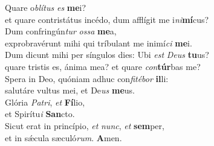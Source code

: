 \oddverse Quare o\textit{blí}\textit{tus} \textit{es} \textbf{me}i?~\*\\
\oddverse et quare contristátus incédo, dum afflígit me i\textit{ni}\textbf{mí}cus?\\
\evenverse Dum confringún\textit{tur} \textit{os}\textit{sa} \textbf{me}a,~\*\\
\evenverse exprobravérunt mihi qui tríbulant me inimí\textit{ci} \textbf{me}i.\\
\oddverse Dum dicunt mihi per síngulos dies: Ubi \textit{est} \textit{De}\textit{us} \textbf{tu}us?~\*\\
\oddverse quare tristis es, ánima mea? et quare \textit{con}\textbf{túr}bas me?\\
\evenverse Spera in Deo, quóniam adhuc con\textit{fi}\textit{té}\textit{bor} \textbf{il}li:~\*\\
\evenverse salutáre vultus mei, et De\textit{us} \textbf{me}us.\\
\oddverse Glória \textit{Pa}\textit{tri}, \textit{et} \textbf{Fí}lio,~\*\\
\oddverse et Spirítu\textit{i} \textbf{San}cto.\\
\evenverse Sicut erat in princípio, \textit{et} \textit{nunc}, \textit{et} \textbf{sem}per,~\*\\
\evenverse et in sǽcula sæculó\textit{rum}. \textbf{A}men.\\
